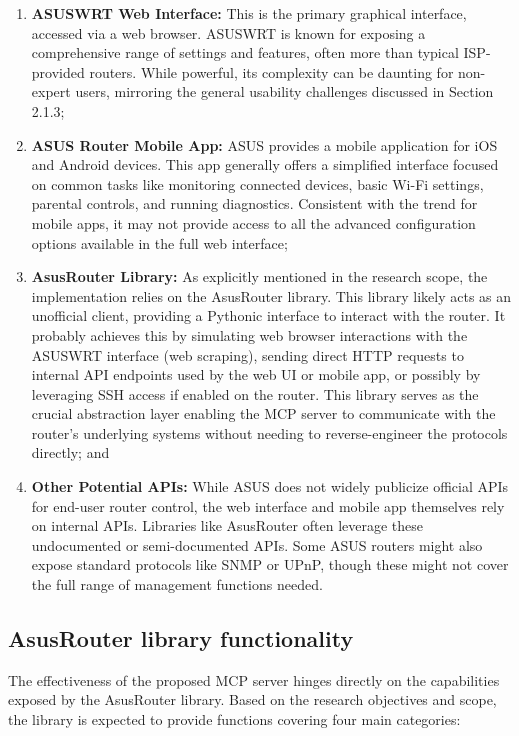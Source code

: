 \begin{enumerate}
\item \textbf{ASUSWRT Web Interface:} This is the primary graphical interface, accessed via a web browser. ASUSWRT is known for exposing a comprehensive range of settings and features, often more than typical ISP-provided routers. While powerful, its complexity can be daunting for non-expert users, mirroring the general usability challenges discussed in Section 2.1.3;

\item \textbf{ASUS Router Mobile App:} ASUS provides a mobile application for iOS and Android devices. This app generally offers a simplified interface focused on common tasks like monitoring connected devices, basic Wi-Fi settings, parental controls, and running diagnostics. Consistent with the trend for mobile apps, it may not provide access to all the advanced configuration options available in the full web interface;

\item \textbf{AsusRouter Library:} As explicitly mentioned in the research scope, the implementation relies on the AsusRouter library. This library likely acts as an unofficial client, providing a Pythonic interface to interact with the router. It probably achieves this by simulating web browser interactions with the ASUSWRT interface (web scraping), sending direct HTTP requests to internal API endpoints used by the web UI or mobile app, or possibly by leveraging SSH access if enabled on the router. This library serves as the crucial abstraction layer enabling the MCP server to communicate with the router's underlying systems without needing to reverse-engineer the protocols directly; and

\item \textbf{Other Potential APIs:} While ASUS does not widely publicize official APIs for end-user router control, the web interface and mobile app themselves rely on internal APIs. Libraries like AsusRouter often leverage these undocumented or semi-documented APIs. Some ASUS routers might also expose standard protocols like SNMP or UPnP, though these might not cover the full range of management functions needed.
\end{enumerate}

\subsection{AsusRouter library functionality}
The effectiveness of the proposed MCP server hinges directly on the capabilities exposed by the AsusRouter library. Based on the research objectives and scope, the library is expected to provide functions covering four main categories:

